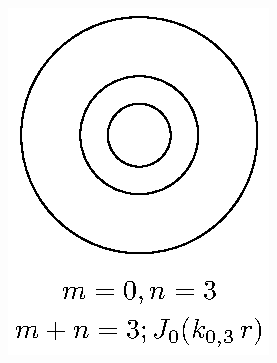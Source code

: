 \begin{minipage}{0.3\textwidth}
\begin{figure}[H]
    \centering
    \includegraphics[scale=1]{Imagenes/Modos_Vibracion_Membrana_0_3.eps}
\end{figure}
\end{minipage}


